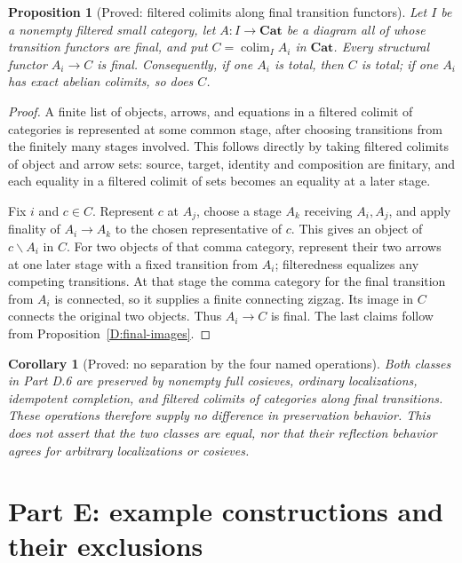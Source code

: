 \documentclass[11pt,a4paper]{article}
\newcommand{\Cat}{\mathbf{Cat}}
\newcommand{\colim}{\operatorname*{colim}}
\newtheorem{proposition}[theorem]{Proposition}
\newtheorem{corollary}[theorem]{Corollary}
\theoremstyle{definition}
\begin{document}
\begin{proposition}[Proved: filtered colimits along final transition functors]\label{D:filtered-unions}
Let $I$ be a nonempty filtered small category, let $A:I\to\Cat$ be a diagram all of whose transition functors are final, and put $C=\colim_I A_i$ in $\Cat$. Every structural functor $A_i\to C$ is final. Consequently, if one $A_i$ is total, then $C$ is total; if one $A_i$ has exact abelian colimits, so does $C$.
\end{proposition}
\begin{proof}
A finite list of objects, arrows, and equations in a filtered colimit of categories is represented at some common stage, after choosing transitions from the finitely many stages involved. This follows directly by taking filtered colimits of object and arrow sets: source, target, identity and composition are finitary, and each equality in a filtered colimit of sets becomes an equality at a later stage.

Fix $i$ and $c\in C$. Represent $c$ at $A_j$, choose a stage $A_k$ receiving $A_i,A_j$, and apply finality of $A_i\to A_k$ to the chosen representative of $c$. This gives an object of $c\backslash A_i$ in $C$. For two objects of that comma category, represent their two arrows at one later stage with a fixed transition from $A_i$; filteredness equalizes any competing transitions. At that stage the comma category for the final transition from $A_i$ is connected, so it supplies a finite connecting zigzag. Its image in $C$ connects the original two objects. Thus $A_i\to C$ is final. The last claims follow from Proposition~\ref{D:final-images}.
\end{proof}

\begin{corollary}[Proved: no separation by the four named operations]\label{D:operations-answer}
Both classes in Part D.6 are preserved by nonempty full cosieves, ordinary localizations, idempotent completion, and filtered colimits of categories along final transitions. These operations therefore supply no difference in preservation behavior. This does not assert that the two classes are equal, nor that their reflection behavior agrees for arbitrary localizations or cosieves.
\end{corollary}
\section{Part E: example constructions and their exclusions}\label{sec:E}
\end{document}
